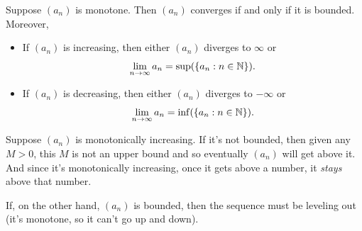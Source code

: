 \documentclass[11pt,twoside=off,numbers=noenddot]{scrbook}
\begin{document}
\begin{theorem}
  Suppose $(a_n)$ is monotone. Then $(a_n)$ converges if and only if
  it is bounded. Moreover,
  \begin{itemize}
    \item If $(a_n)$ is increasing, then either $(a_n)$ diverges to
      $\infty$ or
      \[ \lim_{n \to \infty} a_n = \sup(\{ a_n : n \in \mathbb N \}). \]
    \item If $(a_n)$ is decreasing, then either $(a_n)$ diverges to
      $-\infty$ or
      \[ \lim_{n \to \infty} a_n = \inf(\{ a_n : n \in \mathbb N \}). \]
  \end{itemize}
\end{theorem}

\begin{proofidea}
  Suppose $(a_n)$ is monotonically increasing. If it's not bounded,
  then given any $M > 0$, this $M$ is not an upper bound and so
  eventually $(a_n)$ will get above it. And since it's monotonically
  increasing, once it gets above a number, it \textit{stays} above that number.

  \begin{tightfigure}
    \centering
  \end{tightfigure}

  If, on the other hand, $(a_n)$ is bounded, then the sequence must
  be leveling out (it's monotone, so it can't go up and down).


\end{proofidea}
\end{document}
